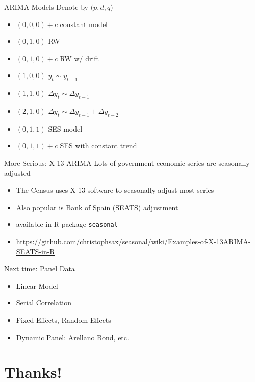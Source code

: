 \begin{frame}{ARIMA Models}
Denote by $(p,d,q$)
\begin{itemize}
\item $(0,0,0) + c$ constant model
\item $(0,1,0)$ RW
\item $(0,1,0)+ c$ RW w/ drift
\item $(1,0,0)$ $y_t \sim y_{t-1}$
\item $(1,1,0)$ $\Delta y_t \sim \Delta y_{t-1}$
\item $(2,1,0)$ $\Delta y_t \sim \Delta y_{t-1}+\Delta y_{t-2}$
\item $(0,1,1)$ SES model
\item $(0,1,1)+c$ SES with constant trend
\end{itemize}
\end{frame}



\begin{frame}{More Serious: X-13 ARIMA}
Lots of government economic series are \alert{seasonally adjusted}
\begin{itemize} 
\item The Census uses X-13 software to seasonally adjust most series
\item Also popular is Bank of Spain (SEATS) adjustment
\item available in R package \texttt{seasonal}
\item \url{https://github.com/christophsax/seasonal/wiki/Examples-of-X-13ARIMA-SEATS-in-R}
\end{itemize}
\end{frame}


\begin{frame}{Next time: Panel Data}
\begin{itemize} 
\item Linear Model
\item Serial Correlation
\item Fixed Effects, Random Effects
\item Dynamic Panel: Arellano Bond, etc.
\end{itemize}
\end{frame}






\section*{Thanks!}


